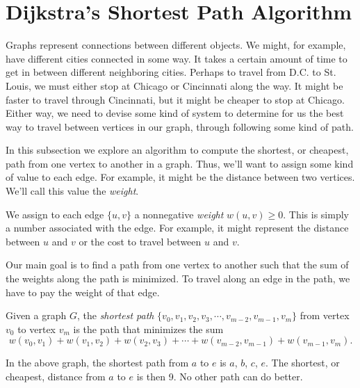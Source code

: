 \documentclass[11pt]{article}
\begin{document}
\section{Dijkstra's Shortest Path Algorithm}

Graphs represent connections between different objects. We might, for example, have different cities connected in some way.
It takes a certain amount of time to get in between different neighboring cities. Perhaps to travel from D.C. to St. Louis,
we must either stop at Chicago or Cincinnati along the way. It might be faster to travel through Cincinnati, but it might be
cheaper to stop at Chicago. Either way, we need to devise some kind of system to determine for us the best way to travel between
vertices in our graph, through following some kind of path.

In this subsection we explore an algorithm to compute the shortest, or cheapest, path from one vertex to another in a graph.
Thus, we'll want to assign some kind of value to each edge. For example, it might be the distance between two
vertices. We'll call this value the \textit{weight}.

\begin{definition}
\label{def:weight}
We assign to each edge $\{u,v\}$ a nonnegative \textit{weight} $w(u,v) \ge 0$. This is simply a number associated with the edge.
For example, it might represent the distance between $u$ and $v$ or the cost to travel between $u$ and $v$.
\end{definition}

Our main goal is to find a path from one vertex to another such that the sum of the weights along the path is
minimized. To travel along an edge in the path, we have to pay the weight of that edge.

\begin{definition}
\label{def:shortest-path}
Given a graph $G$, the \textit{shortest path} $\{v_0, v_1, v_2, v_3, \cdots, v_{m-2}, v_{m-1}, v_m\}$
from vertex $v_0$ to vertex $v_m$ is the path that minimizes
the sum
\[w(v_0,v_1) + w(v_1,v_2) + w(v_2, v_3) + \cdots + w(v_{m-2}, v_{m-1}) + w(v_{m-1}, v_{m}).\]
\begin{center}
\end{center}
In the above graph, the shortest path from $a$ to $e$ is $a$, $b$, $c$, $e$. The shortest, or cheapest,
distance from $a$ to $e$ is then 9. No other path can do better.
\end{definition}
\end{document}
